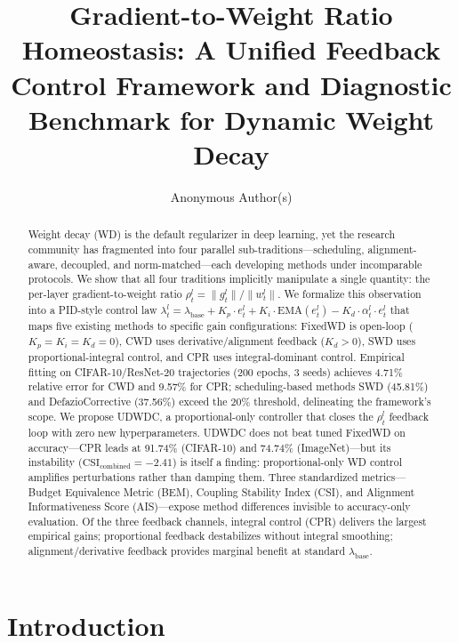 \documentclass{article}
\title{Gradient-to-Weight Ratio Homeostasis: A Unified Feedback Control Framework and Diagnostic Benchmark for Dynamic Weight Decay}
\author{%
  Anonymous Author(s)
}
\begin{document}
\maketitle

\begin{abstract}
Weight decay (WD) is the default regularizer in deep learning, yet the research community has fragmented into four parallel sub-traditions---scheduling, alignment-aware, decoupled, and norm-matched---each developing methods under incomparable protocols. We show that all four traditions implicitly manipulate a single quantity: the per-layer gradient-to-weight ratio $\rho_t^l = \|g_t^l\| / \|w_t^l\|$. We formalize this observation into a PID-style control law $\lambda_t^l = \lambda_{\text{base}} + K_p \cdot e_t^l + K_i \cdot \text{EMA}(e_t^l) - K_d \cdot \alpha_t^l \cdot e_t^l$ that maps five existing methods to specific gain configurations: FixedWD is open-loop ($K_p = K_i = K_d = 0$), CWD uses derivative/alignment feedback ($K_d > 0$), SWD uses proportional-integral control, and CPR uses integral-dominant control. Empirical fitting on CIFAR-10/ResNet-20 trajectories (200 epochs, 3 seeds) achieves 4.71\% relative error for CWD and 9.57\% for CPR; scheduling-based methods SWD (45.81\%) and DefazioCorrective (37.56\%) exceed the 20\% threshold, delineating the framework's scope. We propose UDWDC, a proportional-only controller that closes the $\rho_t^l$ feedback loop with zero new hyperparameters. UDWDC does not beat tuned FixedWD on accuracy---CPR leads at 91.74\% (CIFAR-10) and 74.74\% (ImageNet)---but its instability ($\text{CSI}_{\text{combined}} = -2.41$) is itself a finding: proportional-only WD control amplifies perturbations rather than damping them. Three standardized metrics---Budget Equivalence Metric (BEM), Coupling Stability Index (CSI), and Alignment Informativeness Score (AIS)---expose method differences invisible to accuracy-only evaluation. Of the three feedback channels, integral control (CPR) delivers the largest empirical gains; proportional feedback destabilizes without integral smoothing; alignment/derivative feedback provides marginal benefit at standard $\lambda_{\text{base}}$.
\end{abstract}

\section{Introduction}
\label{sec:intro}
\end{document}
